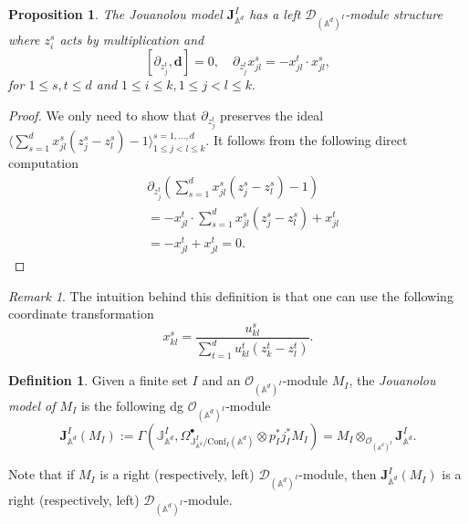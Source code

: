 \documentclass[11pt]{amsart}
\newtheorem{prop}[thm]{Proposition}
\theoremstyle{definition}
\newtheorem{defn}[thm]{Definition}
\theoremstyle{remark}
\newtheorem{rem}[thm]{Remark}
\numberwithin{equation}{section}
\begin{document}
\begin{prop}\label{prop:dmodulestr}
    The Jouanolou model $\mathbf{J}_{\mathbb{A}^d}^{{I}}$ has a left $\mathcal{D}_{(\mathbb{A}^d)^{{I}}}$-module
    structure where $z^s_i$ acts by multiplication and
    \[
   [\partial_{z^t_j},\mathbf{d}]=0 , \quad \partial_{z^t_j}x^s_{jl}=-x^t_{jl}\cdot x^s_{jl},
 \]
for $1\leq s,t\leq d$ and  $1\leq i\leq k, 1\leq j<l\leq k.$
\end{prop}
\begin{proof}
We only need to show that $\partial_{z^t_j}$ preserves the ideal $\langle \sum\limits_{s=1}^dx^s_{jl}(z^s_j-z^s_l)-1\rangle^{s=1,\dots,d}_{1\leq j<l\leq k}$. It follows from the following direct computation
\begin{align*}
   & \partial_{z^t_j} \left(\sum\limits_{s=1}^dx^s_{jl}(z^s_j-z^s_l)-1\right)\\
   & =-x^t_{jl}\cdot\sum\limits_{s=1}^dx^s_{jl}(z^s_j-z^s_l)+x^t_{jl}\\
   &=-x^t_{jl}+x^t_{jl}=0.
\end{align*}

\end{proof}
\begin{rem}
    The intuition behind this definition is that one can use the following coordinate transformation
    $$
    x^s_{kl}=\frac{u^s_{kl}}{\sum\limits^d_{t=1}u^t_{kl}(z^t_k-z^t_l)}.
    $$
\end{rem}

\begin{defn}\label{dfn:jmodel}
Given a finite set ${I}$ and an $\mathcal{O}_{(\mathbb{A}^d)^{{I}}}$-module $M_{{I}}$, the \textit{Jouanolou model of
$M_{{I}}$} is the following dg $\mathcal{O}_{(\mathbb{A}^d)^{{I}}}$-module
\[
\mathbf{J}_{\mathbb{A}^d}^{{I}}(M_{{I}}):=\Gamma\left(\mathbb{J}_{\mathbb{A}^d}^{{I}},\Omega^{\bullet}_{\mathbb{J}_{\mathbb{A}^d}^{{I}}/\mathrm{Conf}_{{I}}(\mathbb{A}^d)}\otimes p^*_{{I}}j^*_{{I}}M_{{I}} \right)=M_{{I}}\otimes_{\mathcal{O}_{(\mathbb{A}^d)^{{I}}}}\mathbf{J}_{\mathbb{A}^d}^{{I}}.
\]

Note that if $M_{{I}}$ is a right (respectively, left) $\mathcal{D}_{(\mathbb{A}^d)^{{I}}}$-module, then $\mathbf{J}
_{\mathbb{A}^d}^{{I}}(M_{{I}})$ is a right (respectively, left) $\mathcal{D}_{(\mathbb{A}^d)^{{I}}}$-module.
\end{defn}
\end{document}
